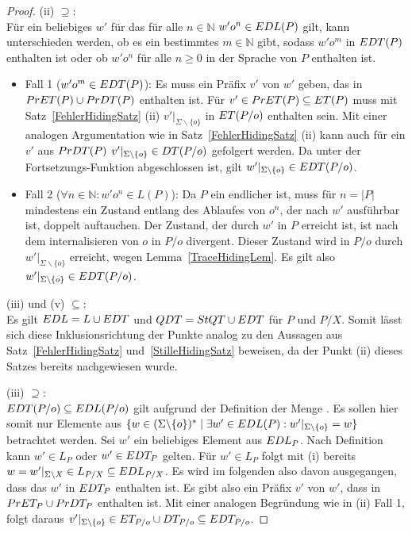 \begin{proof}
  (ii)  \glqq $\supseteq$\grqq{}:\\
  Für ein beliebiges $w'$ für das für alle $n\in\mathbb{N}$ $w'o^n\in EDL (P)$
  gilt, kann unterschieden werden, ob es ein bestimmtes $m\in\mathbb{N}$ gibt,
  sodass $w'o^m$ in $EDT (P)$ enthalten ist oder ob $w'o^n$ für alle $n\geq 0$
  in der Sprache von $P$ enthalten ist.
  \begin{itemize}
    \item Fall 1 ($w'o^m\in EDT (P)$): Es muss ein Präfix $v'$ von $w'$ geben,
      das in $PrET (P)\cup PrDT (P)$ enthalten ist. Für $v'\in PrET (P)
      \subseteq ET (P)$ muss mit Satz~\ref{FehlerHidingSatz} (ii)
      $v'|_{\Sigma\backslash\{o\}}$ in $ET (P/o)$ enthalten sein. Mit einer
      analogen Argumentation wie in Satz~\ref{FehlerHidingSatz} (ii) kann auch
      für ein $v'$ aus $PrDT (P)$ $v'|_{\Sigma\backslash\{o\}}\in DT (P/o)$
      gefolgert werden. Da \EDT{} unter der Fortsetzungs-Funktion \cont{}
      abgeschlossen ist, gilt $w'|_{\Sigma\backslash\{o\}}\in EDT (P/o)$.
    \item Fall 2 ($\forall n\in\mathbb{N}: w'o^n\in L (P)$): Da $P$ ein
      endlicher \MEIO{} ist, muss für $n = |P|$ mindestens ein Zustand entlang
      des Ablaufes von $o^n$, der nach $w'$ ausführbar ist, doppelt auftauchen.
      Der Zustand, der durch $w'$ in $P$ erreicht ist, ist nach dem
      internalisieren von $o$ in $P/o$ divergent. Dieser Zustand wird in $P/o$
      durch $w'|_{\Sigma\backslash\{o\}}$ erreicht, wegen
      Lemma~\ref{TraceHidingLem}. Es gilt also $w'|_{\Sigma\backslash\{o\}} \in
      EDT (P/o)$.
  \end{itemize}

  (iii) und (v) \glqq $\subseteq$\grqq{}:\\
  Es gilt $EDL = L \cup EDT$ und $QDT = StQT \cup EDT$ für $P$ und $P/X$.
  Somit lässt sich diese Inklusionsrichtung der Punkte analog zu den Aussagen
  aus Satz~\ref{FehlerHidingSatz} und~\ref{StilleHidingSatz} beweisen, da der
  Punkt (ii) dieses Satzes bereits nachgewiesen wurde.

  (iii) \glqq $\supseteq$\grqq{}:\\
  $EDT (P/o)\subseteq EDL (P/o)$ gilt aufgrund der Definition der Menge
  \EDL{}. Es sollen hier somit nur Elemente aus $\{w\in (\Sigma\backslash
  \{o\})^*\mid \exists w'\in EDL(P): w'|_{\Sigma\backslash \{o\}} = w\}$
  betrachtet werden. Sei $w'$ ein beliebiges Element aus $EDL _P$. Nach
  Definition kann $w'\in L_P$ oder $w'\in EDT _P$ gelten. Für $w'\in L_P$ folgt
  mit (i) bereits $w = w'|_{\Sigma\backslash X}\in L_{P/X}\subseteq EDL
  _{P/X}$. Es wird im folgenden also davon ausgegangen, dass das $w'$ in $EDT
  _P$ enthalten ist. Es gibt also ein Präfix $v'$ von $w'$, dass in $PrET_P
  \cup PrDT _P$ enthalten ist. Mit einer analogen Begründung wie in (ii) Fall
  1, folgt daraus $v'|_{\Sigma\backslash\{o\}} \in ET _{P/o}\cup DT _{P/o}
  \subseteq EDT _{P/o}$.


\end{proof}

